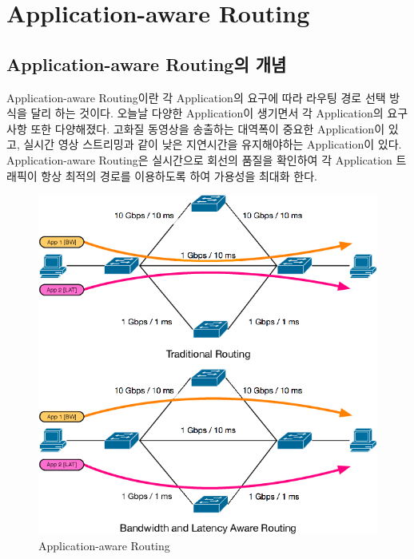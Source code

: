 \section{Application-aware Routing}
\subsection{Application-aware Routing의 개념}
    Application-aware Routing이란 각 Application의 요구에 따라 라우팅 경로 선택 방식을 달리 하는 것이다. 오늘날 다양한 Application이 생기면서 각 Application의 요구사항 또한 다양해졌다. 고화질 동영상을 송출하는 대역폭이 중요한 Application이 있고, 실시간 영상 스트리밍과 같이 낮은 지연시간을 유지해야하는 Application이 있다. Application-aware Routing은 실시간으로 회선의 품질을 확인하여 각 Application 트래픽이 항상 최적의 경로를 이용하도록 하여 가용성을 최대화 한다. \\
    
    \vspace{-4mm}
    \begin{figure}[!h]\centering
		\includegraphics[width=.65\textwidth]{image/week06/5-1.png}
		\caption{\small Application-aware Routing}
		\vspace{-10pt}
    \end{figure}
    

